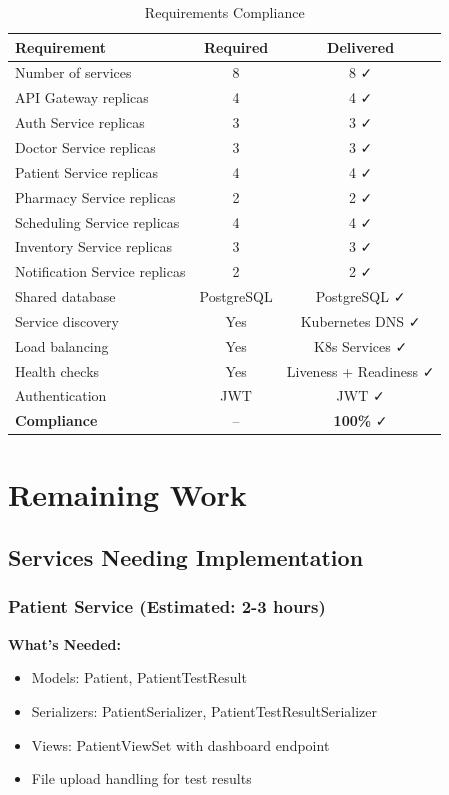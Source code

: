\documentclass[12pt,a4paper]{article}
\begin{document}
\begin{table}[h]
\centering
\begin{tabular}{@{}lcc@{}}
\toprule
\textbf{Requirement} & \textbf{Required} & \textbf{Delivered} \\
\midrule
Number of services & 8 & 8 ✓ \\
API Gateway replicas & 4 & 4 ✓ \\
Auth Service replicas & 3 & 3 ✓ \\
Doctor Service replicas & 3 & 3 ✓ \\
Patient Service replicas & 4 & 4 ✓ \\
Pharmacy Service replicas & 2 & 2 ✓ \\
Scheduling Service replicas & 4 & 4 ✓ \\
Inventory Service replicas & 3 & 3 ✓ \\
Notification Service replicas & 2 & 2 ✓ \\
Shared database & PostgreSQL & PostgreSQL ✓ \\
Service discovery & Yes & Kubernetes DNS ✓ \\
Load balancing & Yes & K8s Services ✓ \\
Health checks & Yes & Liveness + Readiness ✓ \\
Authentication & JWT & JWT ✓ \\
\midrule
\textbf{Compliance} & -- & \textbf{100\%} ✓ \\
\bottomrule
\end{tabular}
\caption{Requirements Compliance}
\end{table}

\section{Remaining Work}

\subsection{Services Needing Implementation}

\subsubsection{Patient Service (Estimated: 2-3 hours)}
\textbf{What's Needed:}
\begin{itemize}
    \item Models: Patient, PatientTestResult
    \item Serializers: PatientSerializer, PatientTestResultSerializer
    \item Views: PatientViewSet with dashboard endpoint
    \item File upload handling for test results
\end{itemize}
\end{document}
